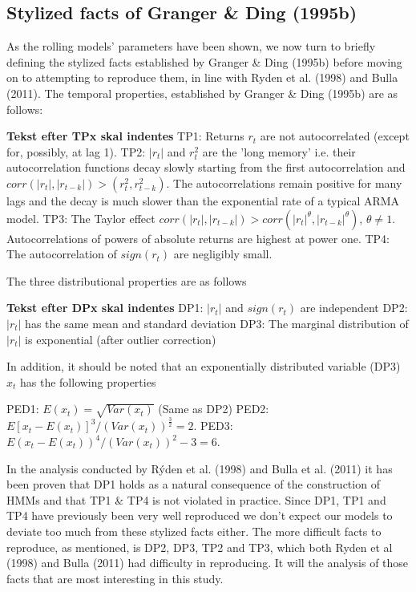 \subsection{Stylized facts of Granger \& Ding (1995b)}
\label{section:stylized_facts_GD}

As the rolling models' parameters have been shown, we now turn to briefly defining the stylized facts established by Granger \& Ding (1995b) before moving on to attempting to reproduce them, in line with Ryden et al. (1998) and Bulla (2011). The temporal properties, established by Granger \& Ding (1995b) are as follows: 

\textbf{Tekst efter TPx skal indentes \newline}
TP1: Returns $r_t$ are not autocorrelated (except for, possibly, at lag 1). \newline
TP2: $|r_t|$ and $r_t^2$ are the 'long memory' i.e. their autocorrelation functions decay slowly starting from the first autocorrelation and $corr(|r_t|, |r_{t-k}|) > (r_t^2, r^2_{t-k})$. The autocorrelations remain positive for many lags and the decay is much slower than the exponential rate of a typical ARMA model. \newline
TP3: The Taylor effect $corr(|r_t|, |r_{t-k}|) > corr(|r_t|^{\theta}, |r_{t-k}|^{\theta})$, $\theta \neq 1$. Autocorrelations of powers of absolute returns are highest at power one. \newline
TP4: The autocorrelation of $sign(r_t)$ are negligibly small.

The three distributional properties are as follows

\textbf{Tekst efter DPx skal indentes \newline}
DP1: $|r_t|$ and $sign(r_t)$ are independent\newline
DP2: $|r_t|$ has the same mean and standard deviation \newline
DP3: The marginal distribution of $|r_t|$ is exponential (after outlier correction)

In addition, it should be noted that an exponentially distributed variable (DP3) $x_t$ has the following properties

PED1: $E(x_t) = \sqrt{Var(x_t)}$ (Same as DP2) \newline
PED2: $E[x_t-E(x_t)]^3 / (Var(x_t))^{\frac{3}{2}} = 2.$ \newline
PED3: $E(x_t-E(x_t))^4 / (Var(x_t))^{2} -3 = 6.$

In the analysis conducted by Rýden et al. (1998) and Bulla et al. (2011) it has been proven that DP1 holds as a natural consequence of the construction of HMMs and that TP1 \& TP4 is not violated in practice. Since DP1, TP1 and TP4 have previously been very well reproduced we don't expect our models to deviate too much from these stylized facts either. The more difficult facts to reproduce, as mentioned, is DP2, DP3, TP2 and TP3, which both Ryden et al (1998) and Bulla (2011) had difficulty in reproducing. It will the analysis of those facts that are most interesting in this study.

